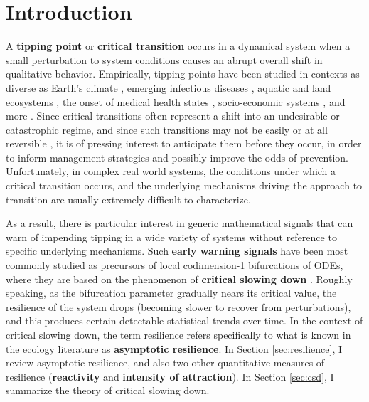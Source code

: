 
\section{Introduction}
\label{sec:intro}

A \textbf{tipping point} or \textbf{critical transition} occurs in a dynamical system when a small perturbation to system conditions causes an abrupt overall shift in qualitative behavior. 
%
Empirically, tipping points have been studied in contexts as diverse as
Earth's climate \cite{lentonTippingElementsEarth2008, dakosSlowingEarlyWarning2008a}, 
emerging infectious diseases \cite{brettDynamicalFootprintsEnable2020}, 
aquatic and land ecosystems \cite{schefferCatastrophicShiftsEcosystems2001a, carpenterRisingVarianceLeading2006}, 
the onset of medical health states \cite{mcsharryPredictionEpilepticSeizures2003, venegasSelforganizedPatchinessAsthma2005}, 
socio-economic systems \cite{ginkelClimateChangeInduced2020}, 
and more \cite{georgeEarlyWarningSignals2021, schefferEarlywarningSignalsCritical2009a, boettigerEarlyWarningSignals2013}. 
%
Since critical transitions often represent a shift into an undesirable or catastrophic regime, and since such transitions may not be easily or at all reversible \cite{albrichClimateChangeCauses2020, chenImperfectVaccineHysteresis2019, lucariniThermodynamicAnalysisSnowball2010}, it is of pressing interest to anticipate them before they occur, in order to inform management strategies and possibly improve the odds of prevention. Unfortunately, in complex real world systems, the conditions under which a critical transition occurs, and the underlying mechanisms driving the approach to transition are usually extremely difficult to characterize.

As a result, there is particular interest in generic mathematical signals that can warn of impending tipping in a wide variety of systems without reference to specific underlying mechanisms. Such \textbf{early warning signals} have been most commonly studied as precursors of local codimension-1 bifurcations of ODEs, where they are based on the phenomenon of \textbf{critical slowing down} \cite{schefferEarlywarningSignalsCritical2009a}. Roughly speaking, as the bifurcation parameter gradually nears its critical value, the resilience of the system drops (becoming slower to recover from perturbations), and this produces certain detectable statistical trends over time. In the context of critical slowing down, the term resilience refers specifically to what is known in the ecology literature as \textbf{asymptotic resilience}. In Section \ref{sec:resilience}, I review asymptotic resilience, and also two other quantitative measures of resilience (\textbf{reactivity} and \textbf{intensity of attraction}). In Section \ref{sec:csd}, I summarize the theory of critical slowing down. 

